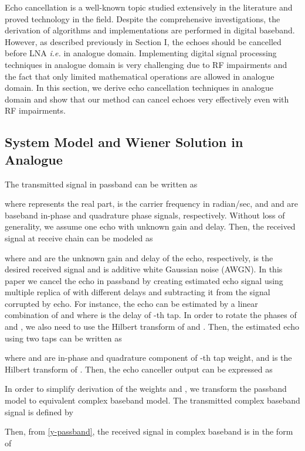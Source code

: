\documentclass[twocolumn]{IEEEtran}
\begin{document}
Echo cancellation is a well-known topic studied extensively in the
literature and proved technology in the field. Despite the
comprehensive investigations, the derivation of algorithms and
implementations are performed in digital baseband. However, as
described previously in Section I, the echoes should be cancelled
before LNA \emph{i.e.} in analogue domain. Implementing digital
signal processing techniques in analogue domain is very challenging
due to RF impairments and the fact that only limited mathematical
operations are allowed in analogue domain. In this section, we
derive echo cancellation techniques in analogue domain and show that
our method can cancel echoes very effectively even with RF
impairments.


\subsection{System Model and Wiener Solution in Analogue}


The transmitted signal in passband can be written as


where  represents the real part,  is the
carrier frequency in radian/sec, and  and  are
baseband in-phase and quadrature phase signals, respectively.
Without loss of generality, we assume one echo with unknown gain and
delay. Then, the received signal  at receive chain can be
modeled as


where  and  are the unknown gain and delay of the echo,
respectively,  is the desired received signal and  is
additive white Gaussian noise (AWGN). In this paper we cancel the
echo in passband by creating estimated echo signal using multiple
replica of  with different delays and subtracting it from the
signal corrupted by echo. For instance, the echo can be estimated by
a linear combination of  and  where
 is the delay of -th tap. In order to rotate the phases
of  and , we also need to use the Hilbert
transform of  and . Then, the estimated
echo using two taps can be written as


where  and  are in-phase and quadrature component of
-th tap weight, and  is the Hilbert transform of . Then, the echo
canceller output can be expressed as



In order to simplify derivation of the weights  and
, we transform the passband model to equivalent complex
baseband model. The transmitted complex baseband signal  is
defined by


Then, from \eqref{y-passband}, the received signal in complex
baseband is in the form of
\end{document}
